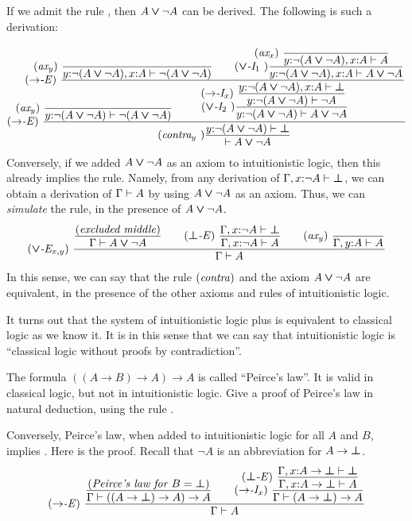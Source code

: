 \documentclass{article}
\begin{document}
If we admit the rule , then $A\mathbin{\textrm{\rm\boldmath $\vee$}}\neg A$ can be
derived. The following is such a derivation:
{\footnotesize
\[ \trule{$\to$-E}\ \deriv{\raisebox{-6ex}{$\squishr{\trule{ax$_y$}~}\deriv{}{\typ{y}{\neg(A\cor\neg A)}\tj\neg(A\cor\neg A)}$}\hspace{-24ex}
  \squishr{\trule{$\to$-E}~}\deriv{\squishr{\trule{ax$_y$}~}\deriv{}{\typ{y}{\neg(A\cor\neg A)},\typ{x}{A}\tj\neg(A\cor\neg A)}
    \sep \trule{$\cor$-I$_1$~}\deriv{\squishr{\trule{ax$_x$}~}\deriv{}{\typ{y}{\neg(A\cor\neg A)},\typ{x}{A}\tj A}}{\typ{y}{\neg(A\cor\neg A)},\typ{x}{A}\tj A\cor\neg A}}{
   \trule{$\cor$-I$_2$~}\deriv{ 
  \squishr{\trule{$\to$-I$_x$}~}\deriv{\typ{y}{\neg(A\cor\neg A)},\typ{x}{A}\tj \cfalse}{\typ{y}{\neg(A\cor\neg A)}\tj \neg A}
  }{\typ{y}{\neg(A\cor\neg A)}\tj A\cor \neg A}\hspace{-18ex}
  }}{\trule{contra$_y$~}\deriv{\typ{y}{\neg(A\cor\neg A)}\tj\cfalse}{\tj A\cor\neg A}}
\]}
Conversely, if we added $A\mathbin{\textrm{\rm\boldmath $\vee$}}\neg A$ as an axiom to intuitionistic
logic, then this already implies the  rule. Namely, from
any derivation of $\Gamma,x{:}\neg A\vdash\textrm{\rm\boldmath $\bot$}$, we can obtain a
derivation of $\Gamma\vdash A$ by using $A\mathbin{\textrm{\rm\boldmath $\vee$}}\neg A$ as an axiom. Thus,
we can {\em simulate} the  rule, in the presence of
$A\mathbin{\textrm{\rm\boldmath $\vee$}}\neg A$.
\[ \trule{$\cor$-E$_{x,y}$}\ \deriv{\deriv{\trule{excluded middle}}{\Gamma\tj A\cor \neg A} \sep
 \trule{$\cfalse$-E}\ \deriv{ \Gamma,\typ{x}{\neg A}\tj\cfalse}{\Gamma,\typ{x}{\neg A}\tj A}
\sep \trule{ax$_y$}\ \deriv{}{\Gamma,\typ{y}{A}\tj A}}{\Gamma\tj A}
\]
In this sense, we can say that the rule $\textrm{(\textit{contra\/})}$ and the axiom
$A\mathbin{\textrm{\rm\boldmath $\vee$}}\neg A$ are equivalent, in the presence of the other axioms and
rules of intuitionistic logic.

It turns out that the system of intuitionistic logic plus
 is equivalent to classical logic as we know it. It is
in this sense that we can say that intuitionistic logic is ``classical
logic without proofs by contradiction''.

\begin{exercise}
  The formula $((A\to B)\to A)\to A$ is called ``Peirce's law''. It is
  valid in classical logic, but not in intuitionistic logic. Give a
  proof of Peirce's law in natural deduction, using the rule
  .
\end{exercise}

Conversely, Peirce's law, when added to intuitionistic logic for all
$A$ and $B$, implies . Here is the proof. Recall that
$\neg A$ is an abbreviation for $A\to\textrm{\rm\boldmath $\bot$}$.
\[ \trule{$\to$-E}~
   \deriv{
   \deriv{\trule{Peirce's law for $B=\cfalse$}}
         {\Gamma\tj((A\to\cfalse)\to A)\to A}
   \sep
   \trule{$\to$-I$_x$}~
   \deriv{
   \squishr{\trule{$\cfalse$-E}~}
   \deriv{\Gamma,\typ{x}{A\to\cfalse}\tj\cfalse}
         {\Gamma,\typ{x}{A\to\cfalse}\tj A}
   }
   {\Gamma\tj(A\to\cfalse)\to A}
   }
   {\Gamma\tj A}
\]
\end{document}
